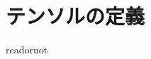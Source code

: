 \documentclass{jsarticle}
\begin{document}
\fi

\section{テンソルの定義}

\expandafter\ifx\csname readornot\endcsname\relax
  
\end{document}
